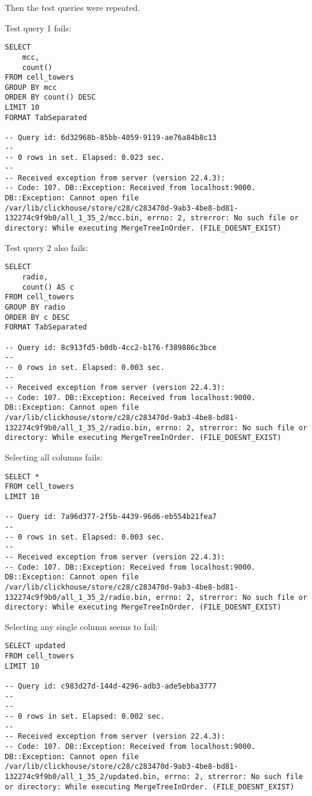Then the test queries were repeated.

Test query 1 fails:
\begin{verbatim}
SELECT
    mcc,
    count()
FROM cell_towers
GROUP BY mcc
ORDER BY count() DESC
LIMIT 10
FORMAT TabSeparated

-- Query id: 6d32968b-85bb-4059-9119-ae76a84b8c13
--
-- 0 rows in set. Elapsed: 0.023 sec.
--
-- Received exception from server (version 22.4.3):
-- Code: 107. DB::Exception: Received from localhost:9000. DB::Exception: Cannot open file /var/lib/clickhouse/store/c28/c283470d-9ab3-4be8-bd81-132274c9f9b0/all_1_35_2/mcc.bin, errno: 2, strerror: No such file or directory: While executing MergeTreeInOrder. (FILE_DOESNT_EXIST)
\end{verbatim}

Test query 2 also fails:
\begin{verbatim}
SELECT
    radio,
    count() AS c
FROM cell_towers
GROUP BY radio
ORDER BY c DESC
FORMAT TabSeparated

-- Query id: 8c913fd5-b0db-4cc2-b176-f389886c3bce
--
-- 0 rows in set. Elapsed: 0.003 sec.
--
-- Received exception from server (version 22.4.3):
-- Code: 107. DB::Exception: Received from localhost:9000. DB::Exception: Cannot open file /var/lib/clickhouse/store/c28/c283470d-9ab3-4be8-bd81-132274c9f9b0/all_1_35_2/radio.bin, errno: 2, strerror: No such file or directory: While executing MergeTreeInOrder. (FILE_DOESNT_EXIST)
\end{verbatim}

Selecting all columns fails:
\begin{verbatim}
SELECT *
FROM cell_towers
LIMIT 10

-- Query id: 7a96d377-2f5b-4439-96d6-eb554b21fea7
--
-- 0 rows in set. Elapsed: 0.003 sec.
--
-- Received exception from server (version 22.4.3):
-- Code: 107. DB::Exception: Received from localhost:9000. DB::Exception: Cannot open file /var/lib/clickhouse/store/c28/c283470d-9ab3-4be8-bd81-132274c9f9b0/all_1_35_2/radio.bin, errno: 2, strerror: No such file or directory: While executing MergeTreeInOrder. (FILE_DOESNT_EXIST)
\end{verbatim}

Selecting any single column seems to fail:
\begin{verbatim}
SELECT updated
FROM cell_towers
LIMIT 10

-- Query id: c983d27d-144d-4296-adb3-ade5ebba3777
--
--
-- 0 rows in set. Elapsed: 0.002 sec.
--
-- Received exception from server (version 22.4.3):
-- Code: 107. DB::Exception: Received from localhost:9000. DB::Exception: Cannot open file /var/lib/clickhouse/store/c28/c283470d-9ab3-4be8-bd81-132274c9f9b0/all_1_35_2/updated.bin, errno: 2, strerror: No such file or directory: While executing MergeTreeInOrder. (FILE_DOESNT_EXIST)
\end{verbatim}

